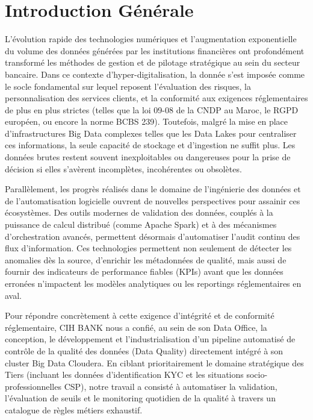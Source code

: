\chapter*{Introduction Générale}

L’évolution rapide des technologies numériques et l’augmentation exponentielle du volume des données générées par les institutions financières ont profondément transformé les méthodes de gestion et de pilotage stratégique au sein du secteur bancaire. Dans ce contexte d'hyper-digitalisation, la donnée s'est imposée comme le socle fondamental sur lequel reposent l'évaluation des risques, la personnalisation des services clients, et la conformité aux exigences réglementaires de plus en plus strictes (telles que la loi 09-08 de la CNDP au Maroc, le RGPD européen, ou encore la norme BCBS 239). Toutefois, malgré la mise en place d'infrastructures Big Data complexes telles que les Data Lakes pour centraliser ces informations, la seule capacité de stockage et d'ingestion ne suffit plus. Les données brutes restent souvent inexploitables ou dangereuses pour la prise de décision si elles s'avèrent incomplètes, incohérentes ou obsolètes.

Parallèlement, les progrès réalisés dans le domaine de l'ingénierie des données et de l'automatisation logicielle ouvrent de nouvelles perspectives pour assainir ces écosystèmes. Des outils modernes de validation des données, couplés à la puissance de calcul distribué (comme Apache Spark) et à des mécanismes d'orchestration avancés, permettent désormais d'automatiser l'audit continu des flux d'information. Ces technologies permettent non seulement de détecter les anomalies dès la source, d'enrichir les métadonnées de qualité, mais aussi de fournir des indicateurs de performance fiables (KPIs) avant que les données erronées n'impactent les modèles analytiques ou les reportings réglementaires en aval.

Pour répondre concrètement à cette exigence d'intégrité et de conformité réglementaire, CIH BANK nous a confié, au sein de son Data Office, la conception, le développement et l'industrialisation d'un pipeline automatisé de contrôle de la qualité des données (Data Quality) directement intégré à son cluster Big Data Cloudera. En ciblant prioritairement le domaine stratégique des Tiers (incluant les données d'identification KYC et les situations socio-professionnelles CSP), notre travail a consisté à automatiser la validation, l'évaluation de seuils et le monitoring quotidien de la qualité à travers un catalogue de règles métiers exhaustif.

